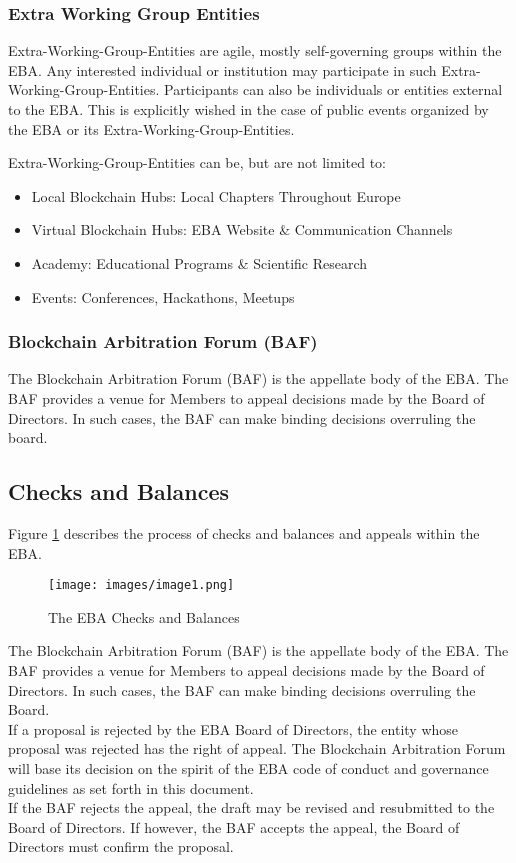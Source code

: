 \documentclass{article}
\begin{document}
\subsubsection{Extra Working Group Entities}

Extra-Working-Group-Entities are agile, mostly self-governing groups within the EBA. 
Any interested individual or institution may participate in such Extra-Working-Group-Entities. 
Participants can also be individuals or entities external to the EBA. 
This is explicitly wished in the case of public events organized by the EBA or its Extra-Working-Group-Entities.

Extra-Working-Group-Entities can be, but are not limited to:

\begin{itemize}
	\item {Local Blockchain Hubs: Local Chapters Throughout Europe}
	\item {Virtual Blockchain Hubs: EBA Website \& Communication Channels}
	\item {Academy: Educational Programs \& Scientific Research}
	\item {Events: Conferences, Hackathons, Meetups}
\end{itemize}

\subsubsection{Blockchain Arbitration Forum (BAF)}

The Blockchain Arbitration Forum (BAF) is the appellate body of the EBA. The BAF provides a venue for Members to appeal decisions made by the Board of Directors. 
In such cases, the BAF can make binding decisions overruling the board.

\subsection{Checks and Balances}

Figure \ref{C_B_Diagram} describes the process of checks and balances and appeals within the EBA. \\

\begin{figure}[h!]
  \texttt{[image: images/image1.png]}
  \caption{The EBA Checks and Balances}
  \label{C_B_Diagram}
\end{figure}

The Blockchain Arbitration Forum (BAF) is the appellate body of the EBA. The BAF provides a venue for Members to appeal decisions made by the  Board of Directors. 
In such cases, the BAF can make binding decisions overruling the Board. \\
If a proposal is rejected by the EBA Board of Directors, the entity whose proposal was rejected has the right of appeal. 
The Blockchain Arbitration Forum will base its decision on the spirit of the EBA code of conduct and governance guidelines as set forth in this document. \\
If the BAF rejects the appeal, the draft may be revised and resubmitted to the Board of Directors. 
If however, the BAF accepts the appeal, the Board of Directors must confirm the proposal.
\end{document}
